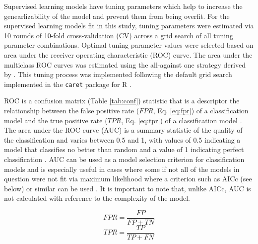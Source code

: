 \documentclass[12pt,letterpaper]{article}\usepackage{graphicx, color}
\begin{document}
Supervised learning models have tuning parameters which help to increase the genearlizability of the model and prevent them from being overfit. For the supervised learning models fit in this study, tuning parameters were estimated via 10 rounds of 10-fold cross-validation (CV) across a grid search of all tuning parameter combinations. Optimal tuning parameter values were selected based on area under the receiver operating characteristic (ROC) curve. The area under the multiclass ROC curves was estimated using the all-against one strategy derived by \citet{Hand2001}. This tuning process was implemented following the default grid search implemented in the \texttt{caret} package for R \citep{Kuhn2013}.


ROC is a confusion matrix (Table \ref{tab:conf}) statistic that is a descriptor the relationship between the false positive rate (\(FPR\), Eq. \ref{eq:fpr}) of a classification model and the true positive rate (\(TPR\), Eq. \ref{eq:tpr}) of a classification model \citep{Hastie2009}. 
The area under the ROC curve (AUC) is a summary statistic of the quality of the classification and varies between 0.5 and 1, with values of 0.5 indicating a model that classifies no better than random and a value of 1 indicating perfect classification \citep{Hastie2009}. AUC can be used as a model selection criterion for classification models and is especially useful in cases where some if not all of the models in question were not fit via maximum likelihood where a criterion such as AICc (see below) or similar can be used \citep{Hastie2009}. It is important to note that, unlike AICc, AUC is not calculated with reference to the complexity of the model.

\begin{equation}
  FPR = \frac{FP}{FP + TN}
  \label{eq:fpr}
\end{equation}
\begin{equation}
  TPR = \frac{TP}{TP + FN}
  \label{eq:tpr}
\end{equation}
\end{document}
